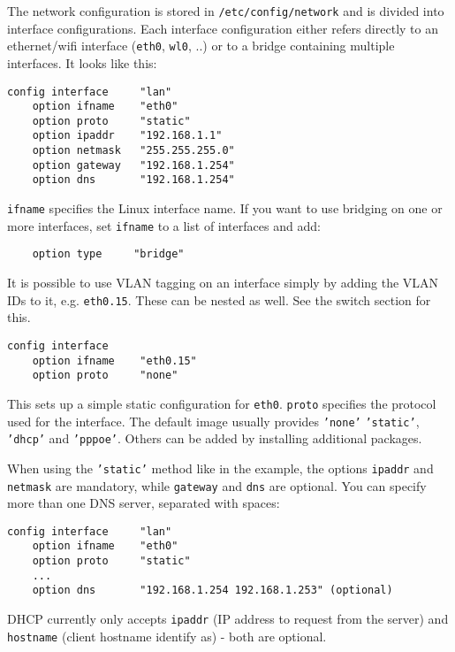 The network configuration is stored in \texttt{/etc/config/network}
and is divided into interface configurations.
Each interface configuration either refers directly to an ethernet/wifi
interface (\texttt{eth0}, \texttt{wl0}, ..) or to a bridge containing multiple interfaces.
It looks like this:

\begin{Verbatim}
config interface     "lan"
    option ifname    "eth0"
    option proto     "static"
    option ipaddr    "192.168.1.1"
    option netmask   "255.255.255.0"
    option gateway   "192.168.1.254"
    option dns       "192.168.1.254"
\end{Verbatim}

\texttt{ifname} specifies the Linux interface name.
If you want to use bridging on one or more interfaces, set \texttt{ifname} to a list
of interfaces and add:
\begin{Verbatim}
    option type     "bridge"
\end{Verbatim}

It is possible to use VLAN tagging on an interface simply by adding the VLAN IDs
to it, e.g. \texttt{eth0.15}. These can be nested as well. See the switch section for
this.

\begin{Verbatim}
config interface
    option ifname    "eth0.15"
    option proto     "none"
\end{Verbatim}

This sets up a simple static configuration for \texttt{eth0}. \texttt{proto} specifies the
protocol used for the interface. The default image usually provides \texttt{'none'}
\texttt{'static'}, \texttt{'dhcp'} and \texttt{'pppoe'}. Others can be added by installing additional
packages.

When using the \texttt{'static'} method like in the example, the  options \texttt{ipaddr} and
\texttt{netmask} are mandatory, while \texttt{gateway} and \texttt{dns} are optional.
You can specify more than one DNS server, separated with spaces:

\begin{Verbatim}
config interface     "lan"
    option ifname    "eth0"
    option proto     "static"
    ...
    option dns       "192.168.1.254 192.168.1.253" (optional)
\end{Verbatim}

DHCP currently only accepts \texttt{ipaddr} (IP address to request from the server)
and \texttt{hostname} (client hostname identify as) - both are optional.

